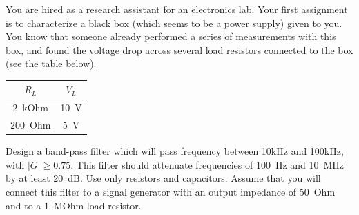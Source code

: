 \documentclass[letterpaper,addpoints,answers]{exam}
\begin{document}
\begin{questions}
\pagebreak

\question
You are hired as a research assistant for an electronics lab. Your first
assignment is to characterize a black box (which seems to be a power
supply) given to you.  
You know that someone already performed a series of measurements
with this box, and found the voltage drop across several load resistors
connected to the box (see the table below).

\begin{tabular}{|c|c|}
\hline$R_L$	  &  $V_L$ \\ 
\hline
2~kOhm	&  10~V \\
200~Ohm &  5~V \\
\hline
\end{tabular}


\question
Design a band-pass filter  which will pass frequency between 10kHz and
100kHz, with $|G| \ge  0.75$. This filter should attenuate frequencies of
100~Hz and 10~MHz by at least 20~dB. Use only resistors and capacitors.
Assume that you will connect this filter to a signal generator with
an output impedance of 50~Ohm and to a 1~MOhm load resistor.
\end{questions}
\end{document}
